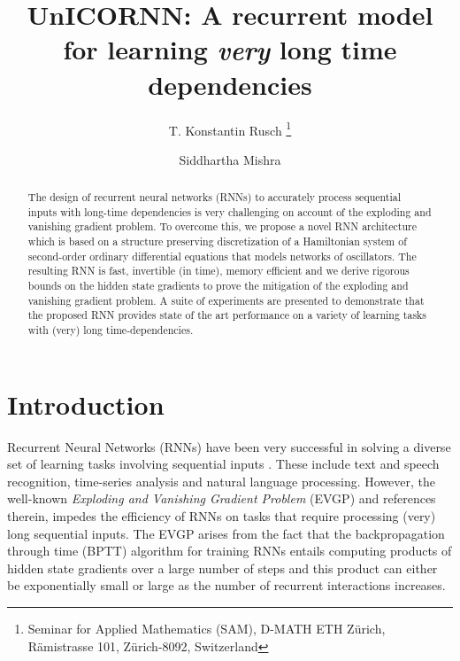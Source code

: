 \documentclass[a4paper]{article}
\newcommand*\samethanks[1][\value{footnote}]{\footnotemark[#1]}
\begin{document}
\date{}

\title{UnICORNN: A recurrent model for learning \textit{very} long time dependencies}

\author{T. Konstantin Rusch \thanks{Seminar for Applied Mathematics (SAM), D-MATH \newline
  ETH Z\"urich, R\"amistrasse 101, 
  Z\"urich-8092, Switzerland} \and Siddhartha Mishra \samethanks}


\maketitle
\begin{abstract}
The design of recurrent neural networks (RNNs) to accurately process sequential inputs with long-time dependencies is very challenging on account of the exploding and vanishing gradient problem. To overcome this, we propose a novel RNN architecture which is based on a structure preserving discretization of a Hamiltonian system of second-order ordinary differential equations that models networks of oscillators. The resulting RNN is fast, invertible (in time), memory efficient and we derive rigorous bounds on the hidden state gradients to prove the mitigation of the exploding and vanishing gradient problem. A suite of experiments are presented to demonstrate that the proposed RNN provides state of the art performance on a variety of learning tasks with (very) long time-dependencies.
\end{abstract}
\section{Introduction}
Recurrent Neural Networks (RNNs) have been very successful in solving a diverse set of learning tasks involving sequential inputs \cite{DLnat}. These include text and speech recognition, time-series analysis and natural language processing. However, the well-known \emph{Exploding and Vanishing Gradient Problem} (EVGP) \cite{vanish_grad} and references therein, impedes the efficiency of RNNs on tasks that require processing (very) long sequential inputs.  The EVGP arises from the fact that the backpropagation through time (BPTT) algorithm for training RNNs entails computing products of hidden state gradients over a large number of steps and this product can either be exponentially small or large as the number of recurrent interactions increases. 
\end{document}
